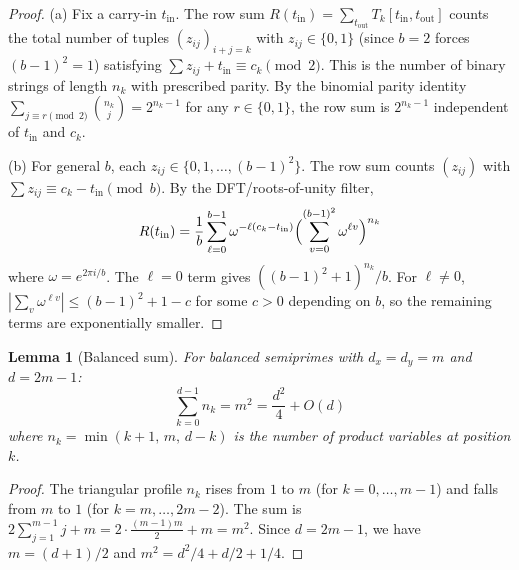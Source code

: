 \documentclass[11pt,a4paper]{article}
\newtheorem{lemma}[theorem]{Lemma}
\begin{document}
\begin{proof}
(a) Fix a carry-in $t_{\mathrm{in}}$.  The row sum $R(t_{\mathrm{in}}) = \sum_{t_{\mathrm{out}}} T_k[t_{\mathrm{in}}, t_{\mathrm{out}}]$ counts the total number of tuples $(z_{ij})_{i+j=k}$ with $z_{ij} \in \{0, 1\}$ (since $b = 2$ forces $(b{-}1)^2 = 1$) satisfying $\sum z_{ij} + t_{\mathrm{in}} \equiv c_k \pmod{2}$. This is the number of binary strings of length $n_k$ with prescribed parity.  By the binomial parity identity $\sum_{j \equiv r \pmod{2}} \binom{n_k}{j} = 2^{n_k - 1}$ for any $r \in \{0,1\}$, the row sum is $2^{n_k - 1}$ independent of $t_{\mathrm{in}}$ and $c_k$.

(b) For general $b$, each $z_{ij} \in \{0, 1, \ldots, (b{-}1)^2\}$.  The row sum counts $(z_{ij})$ with $\sum z_{ij} \equiv c_k - t_{\mathrm{in}} \pmod{b}$.  By the DFT/roots-of-unity filter,
\[
R(t_{\mathrm{in}}) = \frac{1}{b} \sum_{\ell=0}^{b-1} \omega^{-\ell(c_k - t_{\mathrm{in}})} \Bigl(\sum_{v=0}^{(b-1)^2} \omega^{\ell v}\Bigr)^{n_k}
\]
where $\omega = e^{2\pi i/b}$.  The $\ell = 0$ term gives $((b{-}1)^2 + 1)^{n_k}/b$.  For $\ell \neq 0$, $|\sum_v \omega^{\ell v}| \le (b{-}1)^2 + 1 - c$ for some $c > 0$ depending on $b$, so the remaining terms are exponentially smaller.
\end{proof}

\begin{lemma}[Balanced sum]\label{lem:balancedsum}
For balanced semiprimes with $d_x = d_y = m$ and $d = 2m - 1$:
\[
\sum_{k=0}^{d-1} n_k = m^2 = \frac{d^2}{4} + O(d)
\]
where $n_k = \min(k{+}1,\, m,\, d{-}k)$ is the number of product variables at position $k$.
\end{lemma}

\begin{proof}
The triangular profile $n_k$ rises from $1$ to $m$ (for $k = 0, \ldots, m{-}1$) and falls from $m$ to $1$ (for $k = m, \ldots, 2m{-}2$).  The sum is $2\sum_{j=1}^{m-1} j + m = 2\cdot\frac{(m{-}1)m}{2} + m = m^2$.  Since $d = 2m - 1$, we have $m = (d+1)/2$ and $m^2 = d^2/4 + d/2 + 1/4$.
\end{proof}
\end{document}

